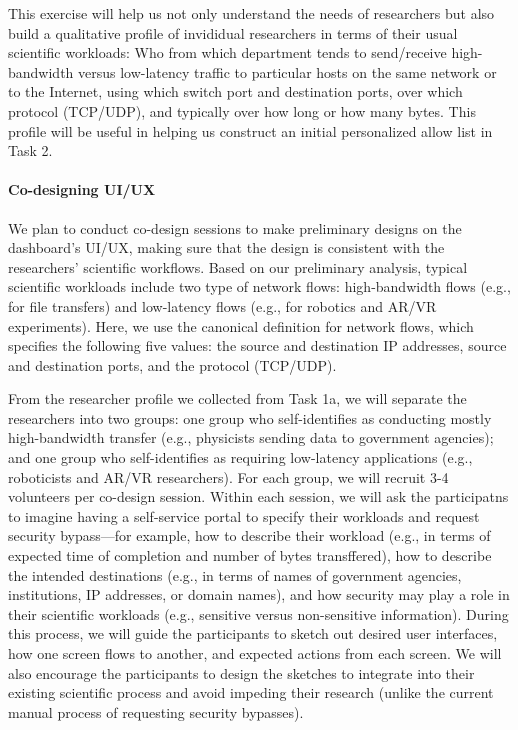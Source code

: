 This exercise will help us not only understand the needs of researchers but also build a qualitative profile of invididual researchers in terms of their usual scientific workloads: Who from which department tends to send/receive high-bandwidth versus low-latency traffic to particular hosts on the same network or to the Internet, using which switch port and destination ports, over which protocol (TCP/UDP), and typically over how long or how many bytes. This profile will be useful in helping us construct an initial personalized allow list in Task 2.


\paragraph{Co-designing UI/UX}
We plan to conduct co-design sessions to make preliminary designs on the dashboard's UI/UX, making sure that the design is consistent with the researchers' scientific workflows.
Based on our preliminary analysis, typical scientific workloads include two type of network flows: high-bandwidth flows (e.g., for file transfers) and low-latency flows (e.g., for robotics and AR/VR experiments). Here, we use the canonical definition for network flows, which specifies the following five values: the source and destination IP addresses, source and destination ports, and the protocol (TCP/UDP).

From the researcher profile we collected from Task 1a, we will separate the researchers into two groups: one group who self-identifies as conducting mostly high-bandwidth transfer (e.g., physicists sending data to government agencies); and one group who self-identifies as requiring low-latency applications (e.g., roboticists and AR/VR researchers). For each group, we will recruit 3-4 volunteers per co-design session. Within each session, we will ask the participatns to imagine having a self-service portal to specify their workloads and request security bypass---for example, how to describe their workload (e.g., in terms of expected time of completion and number of bytes transffered), how to describe the intended destinations (e.g., in terms of names of government agencies, institutions, IP addresses, or domain names), and how security may play a role in their scientific workloads (e.g., sensitive versus non-sensitive information). During this process, we will guide the participants to sketch out desired user interfaces, how one screen flows to another, and expected actions from each screen.  We will also encourage the participants to design the sketches to integrate into their existing scientific process and avoid impeding their research (unlike the current manual process of requesting security bypasses).


